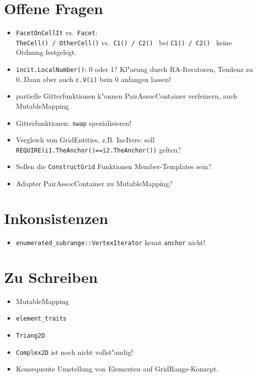 \documentclass[german]{article}
\begin{document}
\section{Offene Fragen}
\begin{itemize}
\item {\tt FacetOnCellIt} vs.\ {\tt Facet}: \\
{\tt TheCell() / OtherCell()} vs.\ {\tt C1() / C2() }
bei {\tt C1() / C2() } keine Ordnung festgelegt.
\item {\tt incit.LocalNumber()}: 0 oder 1? Kl"arung durch 
RA-Iteratoren, Tendenz zu 0. Dann aber auch {\tt c.V(i)} bein 0 anfangen lassen!
\item partielle Gitterfunktionen k"onnen PairAssocContainer verfeinern,
auch MutableMapping
\item Gitterfunktionen: {\tt swap} spezialisieren!
\item Vergleich von GridEntities, z.B. IncIters: soll
{\tt REQUIRE(i1.TheAnchor()==i2.TheAnchor())} gelten?
\item Sollen die {\tt ConstructGrid} Funktionen Member-Templates sein?
\item Adapter PairAssocContainer zu MutableMapping?
\end{itemize}

\section{Inkonsistenzen}

\begin{itemize}
\item {\tt enumerated_subrange::VertexIterator} kennt {\tt anchor} nicht!
\end{itemize}

\section{Zu Schreiben}
\begin{itemize}
\item MutableMapping
\item {\tt element\_traits}
\item {\tt Triang2D}
\item {\tt Complex2D} ist noch nicht vollst"andig!
\item Konsequente Umstellung von Elementen auf GridRange-Konzept.
\end{itemize}
\end{document}
